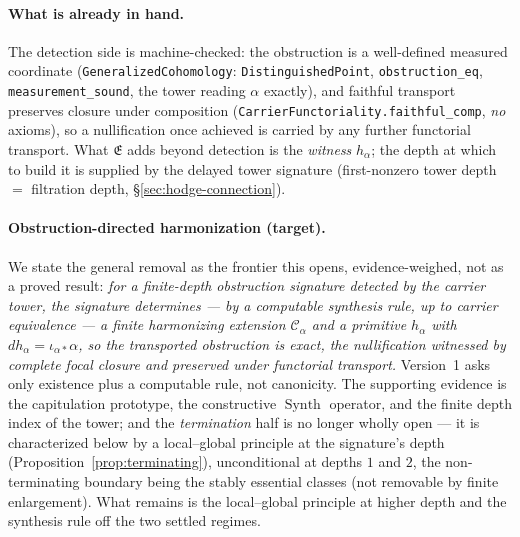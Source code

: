\documentclass[11pt]{article}
\theoremstyle{definition}
\begin{document}
\paragraph{What is already in hand.} The detection side is machine-checked: the obstruction is a well-defined
measured coordinate (\texttt{GeneralizedCohomology}: \texttt{DistinguishedPoint}, \texttt{obstruction\_eq},
\texttt{measurement\_sound}, the tower reading $\alpha$ exactly), and faithful transport preserves closure under
composition (\texttt{CarrierFunctoriality.faithful\_comp}, \emph{no} axioms), so a nullification once achieved is
carried by any further functorial transport. What $\mathfrak E$ adds beyond detection is the \emph{witness}
$h_\alpha$; the depth at which to build it is supplied by the delayed tower signature (first-nonzero tower depth
$=$ filtration depth, \S\ref{sec:hodge-connection}).

\paragraph{Obstruction-directed harmonization (target).} We state the general removal as the frontier this opens,
evidence-weighed, not as a proved result: \emph{for a finite-depth obstruction signature detected by the carrier
tower, the signature determines --- by a computable synthesis rule, up to carrier equivalence --- a finite
harmonizing extension $\mathcal C_\alpha$ and a primitive $h_\alpha$ with $d h_\alpha=\iota_{\alpha*}\alpha$, so
the transported obstruction is exact, the nullification witnessed by complete focal closure and preserved under
functorial transport.} Version~1 asks only existence plus a computable rule, not canonicity. The supporting
evidence is the capitulation prototype, the constructive $\operatorname{Synth}$ operator, and the finite depth
index of the tower; and the \emph{termination} half is no longer wholly open --- it is characterized below by a
local--global principle at the signature's depth (Proposition~\ref{prop:terminating}), unconditional at depths
$1$ and $2$, the non-terminating boundary being the stably essential classes (not removable by finite
enlargement). What remains is the local--global principle at higher depth and the synthesis rule off the two
settled regimes.
\end{document}

